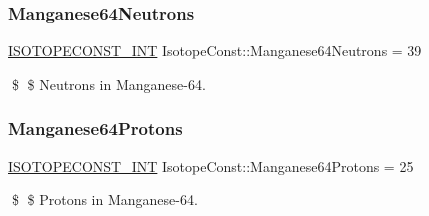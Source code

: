 \subsubsection{\texorpdfstring{Manganese64\+Neutrons}{Manganese64Neutrons}}
{\footnotesize\ttfamily \mbox{\hyperlink{group___isotope_const-_macros_ga5f18360b3e99483a35c32d789e62621c}{I\+S\+O\+T\+O\+P\+E\+C\+O\+N\+S\+T\+\_\+\+I\+NT}} Isotope\+Const\+::\+Manganese64\+Neutrons = 39}

\$ \$ Neutrons in Manganese-\/64. \mbox{\label{group___isotope_const-_manganese-_mn64_ga5d32a637294ab21573f18c855b512b7b}} 
\subsubsection{\texorpdfstring{Manganese64\+Protons}{Manganese64Protons}}
{\footnotesize\ttfamily \mbox{\hyperlink{group___isotope_const-_macros_ga5f18360b3e99483a35c32d789e62621c}{I\+S\+O\+T\+O\+P\+E\+C\+O\+N\+S\+T\+\_\+\+I\+NT}} Isotope\+Const\+::\+Manganese64\+Protons = 25}

\$ \$ Protons in Manganese-\/64. 